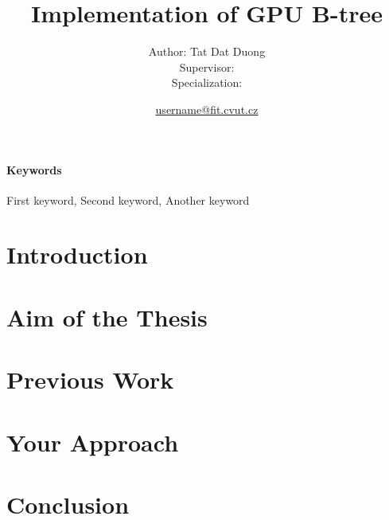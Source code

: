\documentclass{article}
\title{Implementation of GPU B-tree} %
\author{
    \small Author: Tat Dat Duong\\
    \small Supervisor: \\
    \small Specialization:
} %
\date{\small \url{username@fit.cvut.cz}}
\begin{document}
\maketitle              

\paragraph{Keywords}{First keyword, Second keyword, Another keyword}

\section{Introduction}

\section{Aim of the Thesis}

\section{Previous Work}

\section{Your Approach}

\section{Conclusion}
\end{document}
